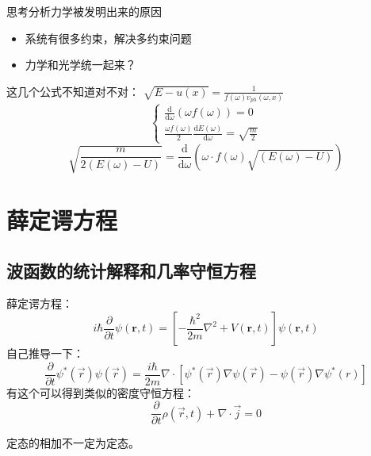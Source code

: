 思考分析力学被发明出来的原因
\begin{itemize}
    \item 系统有很多约束，解决多约束问题
    \item 力学和光学统一起来？
\end{itemize}
这几个公式不知道对不对：
$\sqrt{E-u\left(x\right)}=\frac{1}{f\left(\omega\right)v_{ph}\left(\omega,x\right)}$
$$\begin{cases}\frac{\mathrm{d}}{\mathrm{d}\omega}\left(\omega f\left(\omega\right)\right)=0 \\ \frac{\omega f\left(\omega\right)}{2}\frac{\mathrm{d}E\left(\omega\right)}{\mathrm{d}\omega}=\sqrt{\frac{m}{2}} \end{cases}$$
$$\sqrt{\frac{m}{2\left(E\left(\omega\right)-U\right)}}=\frac{\mathrm{d}}{\mathrm{d}\omega}\left(\omega\cdot f\left(\omega\right)\sqrt{\left(E\left(\omega\right)-U\right)}\right)$$
\chapter{薛定谔方程}
\section{波函数的统计解释和几率守恒方程}
薛定谔方程：\[
i\hbar \frac{\partial}{\partial t}\psi(\mathbf{r},t)
=
\left[
-\frac{\hbar^2}{2m}\nabla^2 + V(\mathbf{r},t)
\right]\psi(\mathbf{r},t)
\]
自己推导一下：$$\frac{\partial}{\partial t}\psi ^*\left( \vec{r} \right) \psi \left( \vec{r} \right) =\frac{i\hbar}{2m}\nabla \cdot \left[ \psi ^*\left( \vec{r} \right) \nabla \psi \left( \vec{r} \right) -\psi \left( \vec{r} \right) \nabla \psi ^*\left( r \right) \right] $$
有这个可以得到类似的密度守恒方程：$$\frac{\partial}{\partial t}\rho \left( \vec{r},t \right) +\nabla \cdot \vec{j}=0$$

定态的相加不一定为定态。